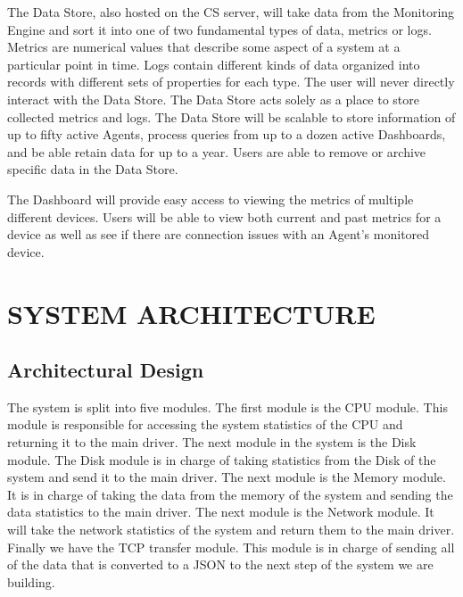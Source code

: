 \documentclass[letterpaper,12pt,oneside,listof=totoc]{scrreprt}
\begin{document}
The Data Store, also hosted on the CS server, will take data from the Monitoring Engine and sort it into one of two fundamental types of data, metrics or logs. Metrics are numerical values that describe some aspect of a system at a particular point in time. Logs contain different kinds of data organized into records with different sets of properties for each type. The user will never directly interact with the Data Store. The Data Store acts solely as a place to store collected metrics and logs. The Data Store will be scalable to store information of up to fifty active Agents, process queries from up to a dozen active Dashboards, and be able retain data for up to a year. Users are able to remove or archive specific data in the Data Store.

The Dashboard will provide easy access to viewing the metrics of multiple different devices. Users will be able to view both current and past metrics for a device as well as see if there are connection issues with an Agent's monitored device. 



\chapter{SYSTEM ARCHITECTURE}

\section{Architectural Design}

The system is split into five modules. The first module is the CPU module. This module is responsible for accessing the system statistics of the CPU and returning it to the main driver. The next module in the system is the Disk module. The Disk module is in charge of taking statistics from the Disk of the system and send it to the main driver. The next module is the Memory module. It is in charge of taking the data from the memory of the system and sending the data statistics to the main driver. The next module is the Network module. It will take the network statistics of the system and return them to the main driver. Finally we have the TCP transfer module. This module is in charge of sending all of the data that is converted to a JSON to the next step of the system we are building.
\end{document}
